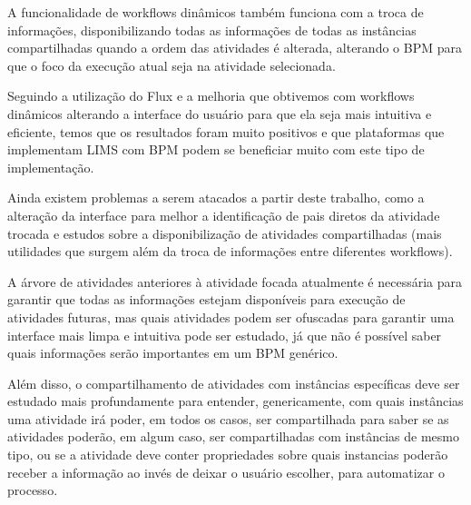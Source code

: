A funcionalidade de workflows dinâmicos também funciona com a troca de informações, disponibilizando todas as informações de todas as instâncias compartilhadas quando a ordem das atividades é alterada, alterando o BPM para que o foco da execução atual seja na atividade selecionada.

Seguindo a utilização do Flux e a melhoria que obtivemos com workflows dinâmicos alterando a interface do usuário para que ela seja mais intuitiva e eficiente, temos que os resultados foram muito positivos e que plataformas que implementam LIMS com BPM podem se beneficiar muito com este tipo de implementação.

Ainda existem problemas a serem atacados a partir deste trabalho, como a alteração da interface para melhor a identificação de pais diretos da atividade trocada e estudos sobre a disponibilização de atividades compartilhadas (mais utilidades que surgem além da troca de informações entre diferentes workflows).

A árvore de atividades anteriores à atividade focada atualmente é necessária para garantir que todas as informações estejam disponíveis para execução de atividades futuras, mas quais atividades podem ser ofuscadas para garantir uma interface mais limpa e intuitiva pode ser estudado, já que não é possível saber quais informações serão importantes em um BPM genérico.

Além disso, o compartilhamento de atividades com instâncias específicas deve ser estudado mais profundamente para entender, genericamente, com quais instâncias uma atividade irá poder, em todos os casos, ser compartilhada para saber se as atividades poderão, em algum caso, ser compartilhadas com instâncias de mesmo tipo, ou se a atividade deve conter propriedades sobre quais instancias poderão receber a informação ao invés de deixar o usuário escolher, para automatizar o processo.
